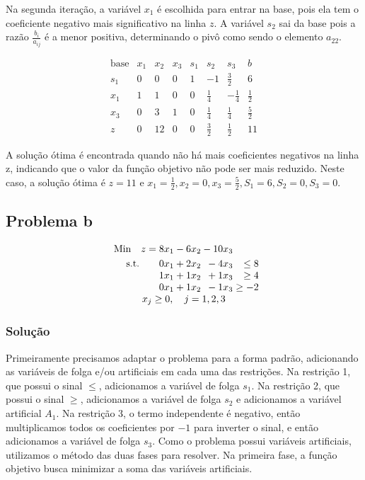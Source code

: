 \documentclass{article}
\begin{document}
Na segunda iteração, a variável $x_1$ é escolhida para entrar na base, pois ela tem o coeficiente negativo mais significativo na linha \(z\). A variável $s_2$ sai da base pois a razão \( \frac{b_i}{a_{ij}} \) é a menor positiva, determinando o pivô como sendo o elemento \(a_{22}\).


\[
  \begin{array}{c|cccccc|c}
    \text{base} & x_1 & x_2 & x_3 & s_1 & s_2 &         s_3 & b \\ \hline
    s_1 &   0 &   0 &   0 &   1 &   -1 & \frac{3}{2} & 6 \\
    x_1 &   1 &   1 &   0 &   0 &  \frac{1}{4} &  -\frac{1}{4} & \frac{1}{2} \\
    x_3 &   0 &   3 &   1 &   0 &   \frac{1}{4} & \frac{1}{4} & \frac{5}{2} \\ \hline
      z &   0 &  12 &   0 &   0 &   \frac{3}{2} & \frac{1}{2} & 11
  \end{array}
\]

A solução ótima é encontrada quando não há mais coeficientes negativos na linha z, indicando que o valor da função objetivo não pode ser mais reduzido. Neste caso, a solução ótima é 
$z = 11$ e $x_1 = \frac{1}{2}, x_2 = 0, x_3 = \frac{5}{2}, S_1 = 6, S_2 = 0, S_3 = 0$.


\subsection{Problema b}

\[
  \begin{array}{r@{}r@{}r@{}r@{}r@{}r}
    \text{Min} \quad z =  8x_1 &{} - 6x_2 &{} - 10x_3 &{} \\[\jot]
    \text{s.t.}\quad\quad 0x_1 &{} + 2x_2 &{} - 4x_3 &{} \leq 8\\
                          1x_1 &{} + 1x_2 &{} + 1x_3 &{} \geq 4\\
                          0x_1 &{} + 1x_2 &{} - 1x_3 &{} \geq -2\\

    \multicolumn{4}{c}{x_j \geq 0, \quad j=1, 2, 3}
  \end{array}
\]

\subsubsection{Solução}

Primeiramente precisamos adaptar o problema para a forma padrão, adicionando as variáveis de folga e/ou artificiais em cada uma das restrições.
Na restrição 1, que possui o sinal $\leq$, adicionamos a variável de folga $s_1$.
Na restrição 2, que possui o sinal $\geq$, adicionamos a variável de folga $s_2$ e adicionamos a variável artificial $A_1$.
Na restrição 3, o termo independente é negativo, então multiplicamos todos os coeficientes por $-1$ para inverter o sinal, e então adicionamos a variável de folga $s_3$.
Como o problema possui variáveis artificiais, utilizamos o método das duas fases para resolver.
Na primeira fase, a função objetivo busca minimizar a soma das variáveis artificiais.
\end{document}
